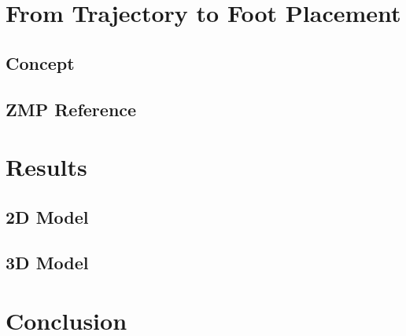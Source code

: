 \documentclass{UoNMCHA}
\begin{document}
	\clearpage	
	\newpage\section{From Trajectory to Foot Placement}\label{sec:Novel Method for Trajectory Tracking}
		
		\subsection{Concept}
			
		\clearpage\subsection{ZMP Reference}
			
			
	\clearpage		
	\newpage\section{Results}\label{sec:Results}
		\subsection{2D Model}
			
		\subsection{3D Model}
			
	
	\clearpage
	\newpage\section{Conclusion}\label{sec:Conclusion}
		

	\newpage %
		
\end{document}

